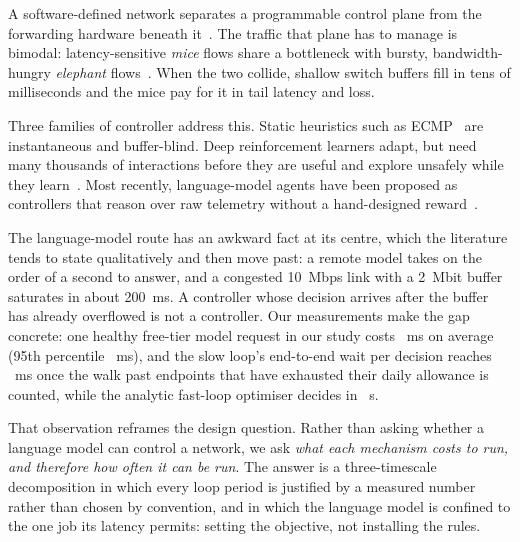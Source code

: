\documentclass[conference]{IEEEtran}
\begin{document}
A software-defined network separates a programmable control plane from the
forwarding hardware beneath it~\cite{mckeown2008openflow}. The traffic that plane
has to manage is bimodal: latency-sensitive \emph{mice} flows share a bottleneck
with bursty, bandwidth-hungry \emph{elephant} flows~\cite{alizadeh2010dctcp}. When
the two collide, shallow switch buffers fill in tens of milliseconds and the mice
pay for it in tail latency and loss.

Three families of controller address this. Static heuristics such as
ECMP~\cite{hopps2000ecmp} are instantaneous and buffer-blind. Deep reinforcement
learners adapt, but need many thousands of interactions before they are useful and
explore unsafely while they learn~\cite{xu2018experience}. Most recently,
language-model agents have been proposed as controllers that reason over raw
telemetry without a hand-designed reward~\cite{araujo2024agentic,li2026redsi,
jamshidi2026governance}.

The language-model route has an awkward fact at its centre, which the literature
tends to state qualitatively and then move past: a remote model takes on the order
of a second to answer, and a congested 10~Mbps link with a 2~Mbit buffer saturates
in about 200~ms. A controller whose decision arrives after the buffer has already
overflowed is not a controller. Our measurements make the gap concrete: one
healthy free-tier model request in our study costs \ResLLMLatency~ms on average
(95th percentile \ResLLMPNinetyFive~ms), and the slow loop's end-to-end wait per
decision reaches \ResOneCtrl~ms once the walk past endpoints that have exhausted
their daily allowance is counted, while the analytic fast-loop optimiser decides
in \ResFastUs~\textmu s.

That observation reframes the design question. Rather than asking whether a
language model can control a network, we ask \emph{what each mechanism costs to
run, and therefore how often it can be run}. The answer is a three-timescale
decomposition in which every loop period is justified by a measured number rather
than chosen by convention, and in which the language model is confined to the one
job its latency permits: setting the objective, not installing the rules.
\end{document}

